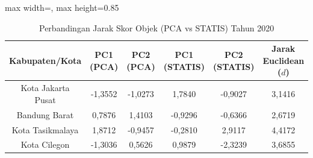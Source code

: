 \begin{table}[H]
\centering
\caption{Perbandingan Jarak Skor Objek (PCA vs STATIS) Tahun 2020} \label{tab:sample1jarak_skor_2020}
\begin{adjustbox}{max width=\textwidth, max height=0.85\textheight}
\begin{tabular}{|c|c|c|c|c|c|}
\hline
\textbf{Kabupaten/Kota} & \textbf{PC1 (PCA)} & \textbf{PC2 (PCA)} & \textbf{PC1 (STATIS)} & \textbf{PC2 (STATIS)} & \textbf{Jarak Euclidean ($d$)} \\
\hline
Kota Jakarta Pusat & -1,3552 & -1,0273 & 1,7840 & -0,9027 & 3,1416 \\
Bandung Barat & 0,7876 & 1,4103 & -0,9296 & -0,6366 & 2,6719 \\
Kota Tasikmalaya & 1,8712 & -0,9457 & -0,2810 & 2,9117 & 4,4172 \\
Kota Cilegon & -1,3036 & 0,5626 & 0,9879 & -2,3239 & 3,6855 \\
\hline
\end{tabular}
\end{adjustbox}
\end{table}
